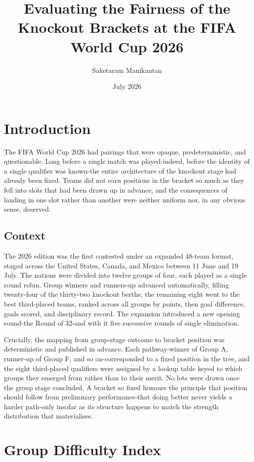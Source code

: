 \documentclass[11pt]{article}
\title{Evaluating the Fairness of the Knockout Brackets at the FIFA World Cup 2026}
\author{Saketaram Manikantan}
\date{July 2026}
\begin{document}
\maketitle



\section{Introduction}

The FIFA World Cup 2026 had pairings that were opaque, predeterministic, and questionable. Long before a single match was played-indeed, before the identity of a single qualifier was known-the entire architecture of the knockout stage had already been fixed. Teams did not earn positions in the bracket so much as they fell into slots that had been drawn up in advance, and the consequences of landing in one slot rather than another were neither uniform nor, in any obvious sense, deserved.

\subsection{Context}

The 2026 edition was the first contested under an expanded 48-team format, staged across the United States, Canada, and Mexico between 11 June and 19 July. The nations were divided into twelve groups of four, each played as a single round robin. Group winners and runners-up advanced automatically, filling twenty-four of the thirty-two knockout berths; the remaining eight went to the best third-placed teams, ranked across all groups by points, then goal difference, goals scored, and disciplinary record. The expansion introduced a new opening round-the Round of 32-and with it five successive rounds of single elimination.

Crucially, the mapping from group-stage outcome to bracket position was deterministic and published in advance. Each pathway-winner of Group A, runner-up of Group F, and so on-corresponded to a fixed position in the tree, and the eight third-placed qualifiers were assigned by a lookup table keyed to which groups they emerged from rather than to their merit. No lots were drawn once the group stage concluded. A bracket so fixed honours the principle that position should follow from preliminary performance-that doing better never yields a harder path-only insofar as its structure happens to match the strength distribution that materialises.

\section{Group Difficulty Index}
\label{sec:strength}
\end{document}
